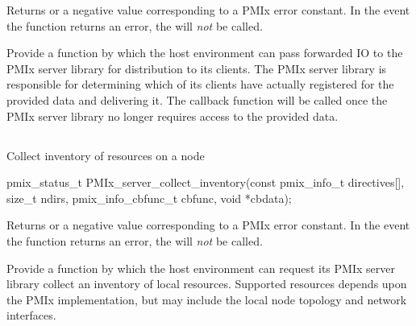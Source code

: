 Returns  or a negative value corresponding to a PMIx error constant. In the event the function returns an error, the  will \textit{not} be called.

\descr

Provide a function by which the host environment can pass forwarded \ac{IO} to the \ac{PMIx} server library for distribution to its clients. The \ac{PMIx} server library is responsible for determining which of its clients have actually registered for the provided data and delivering it. The  callback function will be called once the \ac{PMIx} server library no longer requires access to the provided data.

\subsection{}

\summary

Collect inventory of resources on a node

\format

\cspecificstart
\begin{codepar}
pmix_status_t
PMIx_server_collect_inventory(const pmix_info_t directives[],
                              size_t ndirs,
                              pmix_info_cbfunc_t cbfunc,
                              void *cbdata);
\end{codepar}
\cspecificend

\begin{arglist}
\end{arglist}

Returns  or a negative value corresponding to a PMIx error constant. In the event the function returns an error, the  will \textit{not} be called.

\descr

Provide a function by which the host environment can request its \ac{PMIx} server library collect an inventory of local resources. Supported resources depends upon the \ac{PMIx} implementation, but may include the local node topology and network interfaces.

